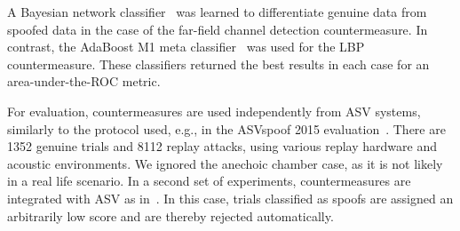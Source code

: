 A Bayesian network classifier~\cite{Pearl1988} was learned to differentiate genuine data from spoofed data in the case of the far-field channel detection countermeasure.  In contrast, the AdaBoost M1 meta classifier~\cite{Freund1999}  was used for the LBP countermeasure.  These classifiers returned the best results in each case for an area-under-the-ROC metric.  %



For evaluation, countermeasures are used independently from ASV systems, similarly to the protocol used, e.g., in the ASVspoof 2015 evaluation~\cite{Wu2015}.  There are 1352 genuine trials and 8112 replay attacks, using various replay hardware and acoustic environments.  We ignored the anechoic chamber case, as it is not likely in a real life scenario.  In a second set of experiments, countermeasures are integrated with ASV as in~\cite{Alegre2013a}.  In this case, trials classified as spoofs are assigned an arbitrarily low score and are thereby rejected automatically.
